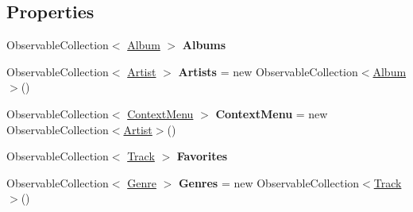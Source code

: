 \subsection*{Properties}
\begin{DoxyCompactItemize}
\item 
\mbox{\label{class_presentation_1_1_view_model_1_1_music_view_model_a343218f8efd58ceb0a2145926e871f4b}} 
Observable\+Collection$<$ \hyperlink{class_d_t_o_1_1_entity_1_1_album}{Album} $>$ {\bfseries Albums}
\item 
\mbox{\label{class_presentation_1_1_view_model_1_1_music_view_model_ae5a6c636bbb67e6aecc47b2b7e3db3cf}} 
Observable\+Collection$<$ \hyperlink{class_d_t_o_1_1_entity_1_1_artist}{Artist} $>$ {\bfseries Artists} = new Observable\+Collection$<$\hyperlink{class_d_t_o_1_1_entity_1_1_album}{Album}$>$()
\item 
\mbox{\label{class_presentation_1_1_view_model_1_1_music_view_model_a117bfb1393d36a49d4c1fdf636c04d00}} 
Observable\+Collection$<$ \hyperlink{class_d_t_o_1_1_context_menu}{Context\+Menu} $>$ {\bfseries Context\+Menu} = new Observable\+Collection$<$\hyperlink{class_d_t_o_1_1_entity_1_1_artist}{Artist}$>$()
\item 
\mbox{\label{class_presentation_1_1_view_model_1_1_music_view_model_a2ec7de9cebab5ba2a33f7c13a7cd1176}} 
Observable\+Collection$<$ \hyperlink{class_d_t_o_1_1_entity_1_1_track}{Track} $>$ {\bfseries Favorites}
\item 
\mbox{\label{class_presentation_1_1_view_model_1_1_music_view_model_ad5cee341960517b1c950914de57a7b8f}} 
Observable\+Collection$<$ \hyperlink{class_d_t_o_1_1_entity_1_1_genre}{Genre} $>$ {\bfseries Genres} = new Observable\+Collection$<$\hyperlink{class_d_t_o_1_1_entity_1_1_track}{Track}$>$()

\end{DoxyCompactItemize}
